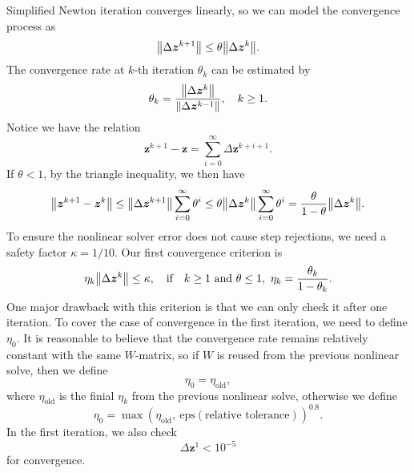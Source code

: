 \documentclass[a4paper,9pt]{article}
\theoremstyle{definition}
\theoremstyle{remark}
\begin{document}
Simplified Newton iteration converges linearly, so we can model the convergence
process as
\begin{equation}
  \norm{\Delta \bm{z}^{k+1}} \le \theta \norm{\Delta \bm{z}^{k}}.
\end{equation}
The convergence rate at $k$-th iteration $\theta_k$ can be estimated by
\begin{equation}
  \theta_k = \frac{\norm{\Delta\bm{z}^{k}}}{\norm{\Delta\bm{z}^{k-1}}},\quad k\ge 1.
\end{equation}
Notice we have the relation
\begin{equation}
  \bm{z}^{k+1} - \bm{z} = \sum_{i=0}^\infty \Delta\bm{z}^{k+i+1}.
\end{equation}
If $\theta<1$, by the triangle inequality, we then have
\begin{equation}
  \norm{\bm{z}^{k+1} - \bm{z}^{k}} \le
  \norm{\Delta\bm{z}^{k+1}}\sum_{i=0}^\infty \theta^i \le \theta
  \norm{\Delta\bm{z}^{k}}\sum_{i=0}^\infty \theta^i = \frac{\theta}{1-\theta}
  \norm{\Delta\bm{z}^{k}}.
\end{equation}
To ensure the nonlinear solver error does not cause step rejections, we need a
safety factor $\kappa = 1/10$. Our first convergence criterion is
\begin{equation}
  \eta_k \norm{\Delta\bm{z}^k} \le \kappa, \qq{if}
  k \ge 1 \text{ and } \theta \le 1, ~ \eta_k=\frac{\theta_k}{1-\theta_k}.
\end{equation}
One major drawback with this criterion is that we can only check it after one
iteration. To cover the case of convergence in the first iteration, we need to
define $\eta_0$. It is reasonable to believe that the convergence rate remains
relatively constant with the same $W$-matrix, so if $W$ is reused
 from the previous nonlinear solve,
then we define
\begin{equation}
  \eta_0 = \eta_{\text{old}},
\end{equation}
where $\eta_{\text{old}}$ is the finial $\eta_k$ from the previous nonlinear
solve, otherwise we define
\begin{equation}
  \eta_0 = \max(\eta_{\text{old}}, ~\text{eps}(\text{relative
  tolerance}))^{0.8}.
\end{equation}
In the first iteration, we also check
\begin{equation}
  \Delta\bm{z}^{1} < 10^{-5}
\end{equation}
for convergence. 
\end{document}
